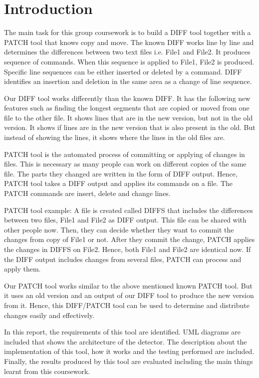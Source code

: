 \chapter{Introduction}

The main task for this group coursework is to build a DIFF tool together with a PATCH tool that knows copy and move.
The known DIFF works line by line and determines the differences between two text files i.e. File1 and File2.
It produces sequence of commands.
When this sequence is applied to File1, File2 is produced.
Specific line sequences can be either inserted or deleted by a command.
DIFF identifies an insertion and deletion in the same area as a change of line sequence.

Our DIFF tool works differently than the known DIFF.
It has the following new features such as finding the longest segments that are copied or moved from one file to the other file.
It shows lines that are in the new version, but not in the old version.
It shows if lines are in the new version that is also present in the old.
But instead of showing the lines, it shows where the lines in the old files are.

PATCH tool is the automated process of committing or applying of changes in files. 
This is necessary as many people can work on different copies of the same file.
The parts they changed are written in the form of DIFF output.
Hence, PATCH tool takes a DIFF output and applies its commands on a file.
The PATCH commands are insert, delete and change lines. 

PATCH tool example: A file is created called DIFFS that includes the differences between two files, File1 and File2 as DIFF output.
This file can be shared with other people now.
Then, they can decide whether they want to commit the changes from copy of File1 or not.
After they commit the change, PATCH applies the changes in DIFFS on File2.
Hence, both File1 and File2 are identical now.
If the DIFF output includes changes from several files, PATCH can process and apply them.

Our PATCH tool works similar to the above mentioned known PATCH tool.
But it uses an old version and an output of our DIFF tool to produce the new version from it.
Hence, this DIFF/PATCH tool can be used to determine and distribute changes easily and effectively.

In this report, the requirements of this tool are identified.
UML diagrams are included that shows the architecture of the detector.
The description about the implementation of this tool, how it works and the testing performed are included.
Finally, the results produced by this tool are evaluated including the main things learnt from this coursework.
